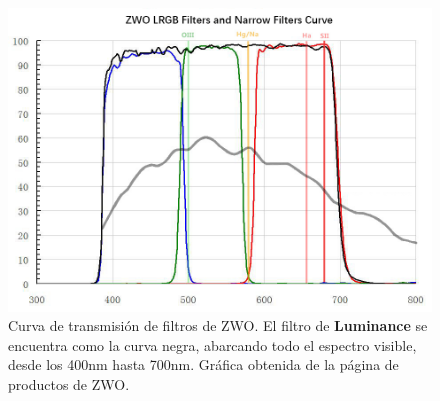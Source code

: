 \begin{figure}[!ht]
	\centering
	\includegraphics[scale=0.6]{Observaciones/Secciones/Figures/ZWO RGBL Transmission Curve.jpg}
	\caption{Curva de transmisión de filtros de ZWO. El filtro de
	\textbf{Luminance} se encuentra como la curva negra, abarcando todo el
	espectro visible, desde los 400nm hasta 700nm. Gráfica obtenida de la
	página de productos de ZWO.}
	\label{zwoFilterTransmissionCurve}
\end{figure}